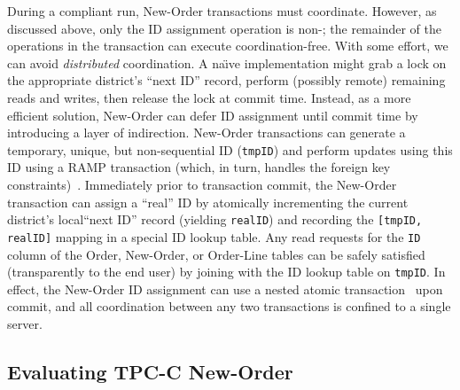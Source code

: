 During a compliant run, New-Order transactions must
coordinate. However, as discussed above, only the ID assignment
operation is non-\iconfluent; the remainder of the operations in the
transaction can execute coordination-free. With some effort, we can
avoid \textit{distributed }coordination. A na\"{\i}ve implementation might grab
a lock on the appropriate district's ``next ID'' record, perform
(possibly remote) remaining reads and writes, then release the lock at
commit time. Instead, as a more efficient solution, New-Order can
defer ID assignment until commit time by introducing a layer of
indirection. New-Order transactions can generate a temporary, unique,
but non-sequential ID (\texttt{tmpID}) and perform updates using this
ID using a RAMP transaction (which, in turn, handles the foreign key
constraints)~\cite{ramp-sigmod14}. Immediately prior to transaction
commit, the New-Order transaction can assign a ``real'' ID by
atomically incrementing the current district's local``next ID'' record
(yielding \texttt{realID}) and recording the \texttt{[tmpID, realID]}
mapping in a special ID lookup table. Any read requests for the
\texttt{ID} column of the Order, New-Order, or Order-Line tables can
be safely satisfied (transparently to the end user) by joining with
the ID lookup table on \texttt{tmpID}. In effect, the New-Order ID
assignment can use a nested atomic
transaction~\cite{atomictransactions} upon commit, and all
coordination between any two transactions is confined to a
single server.

\subsection{Evaluating TPC-C New-Order}
\label{sec:evaltpcc}


